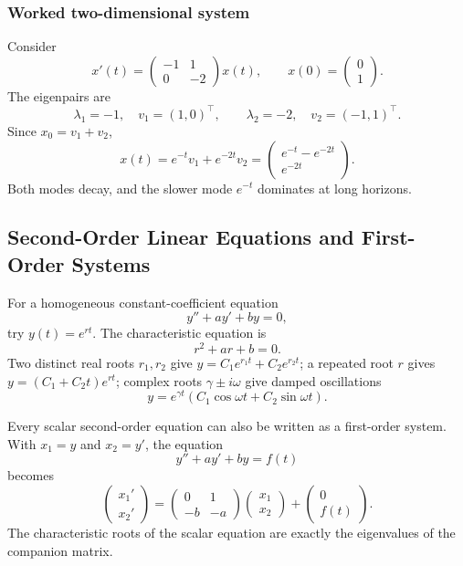 \documentclass[11pt]{article}
\theoremstyle{definition}
\theoremstyle{plain}
\theoremstyle{remark}
\begin{document}
\subsubsection*{Worked two-dimensional system}

Consider
\[
x'(t)=\begin{pmatrix}-1&1\\0&-2\end{pmatrix}x(t),
\qquad x(0)=\begin{pmatrix}0\\1\end{pmatrix}.
\]
The eigenpairs are
\[
\lambda_1=-1,\quad v_1=(1,0)^\top,
\qquad
\lambda_2=-2,\quad v_2=(-1,1)^\top.
\]
Since $x_0=v_1+v_2$,
\[
x(t)=e^{-t}v_1+e^{-2t}v_2
=\boxed{\begin{pmatrix}e^{-t}-e^{-2t}\\e^{-2t}\end{pmatrix}}.
\]
Both modes decay, and the slower mode $e^{-t}$ dominates at long horizons.

\subsection{Second-Order Linear Equations and First-Order Systems}

For a homogeneous constant-coefficient equation
\[
y''+ay'+by=0,
\]
try $y(t)=e^{rt}$. The characteristic equation is
\[
r^2+ar+b=0.
\]
Two distinct real roots $r_1,r_2$ give
$y=C_1e^{r_1t}+C_2e^{r_2t}$; a repeated root $r$ gives
$y=(C_1+C_2t)e^{rt}$; complex roots $\gamma\pm i\omega$ give damped
oscillations
\[
y=e^{\gamma t}(C_1\cos\omega t+C_2\sin\omega t).
\]

Every scalar second-order equation can also be written as a first-order system.
With $x_1=y$ and $x_2=y'$, the equation
\[
y''+ay'+by=f(t)
\]
becomes
\[
\boxed{
\begin{pmatrix}x_1'\\x_2'\end{pmatrix}
=\begin{pmatrix}0&1\\-b&-a\end{pmatrix}
\begin{pmatrix}x_1\\x_2\end{pmatrix}
+\begin{pmatrix}0\\f(t)\end{pmatrix}.}
\]
The characteristic roots of the scalar equation are exactly the eigenvalues
of the companion matrix.
\end{document}
